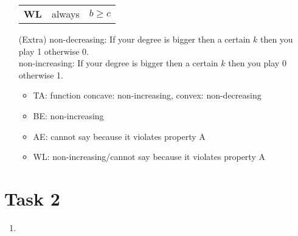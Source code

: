 \documentclass{article}
\begin{document}
\begin{enumerate}[label=(\alph*)]
\begin{center}
\begin{tabular}{c|C{5cm}|C{5cm}}
				\hline
				\textbf{WL} & always & $b\ge c$
			\end{tabular}
		\end{center}
		\item[(Extra)] non-decreasing: If your degree is bigger then a certain $k$ then you play 1 otherwise 0. \\
		non-increasing: If your degree is bigger then a certain $k$ then you play 0 otherwise 1.
		\begin{itemize}
			\item TA: function concave: non-increasing, convex: non-decreasing
			\item BE: non-increasing
			\item AE: cannot say because it violates property A
			\item WL: non-increasing/cannot say because it violates property A
		\end{itemize}
	\end{enumerate}

	\section*{Task 2}
	\begin{enumerate}[label=(\alph*)]
		\item 
	\end{enumerate}
\end{document}
